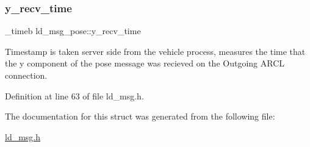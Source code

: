 \subsubsection{\texorpdfstring{y\+\_\+recv\+\_\+time}{y\_recv\_time}}
{\footnotesize\ttfamily \+\_\+timeb ld\+\_\+msg\+\_\+pose\+::y\+\_\+recv\+\_\+time}

Timestamp is taken server side from the vehicle process, measures the time that the y component of the pose message was recieved on the Outgoing A\+R\+CL connection. 

Definition at line 63 of file ld\+\_\+msg.\+h.



The documentation for this struct was generated from the following file\+:\begin{DoxyCompactItemize}
\item 
\mbox{\hyperlink{ld__msg_8h}{ld\+\_\+msg.\+h}}\end{DoxyCompactItemize}
